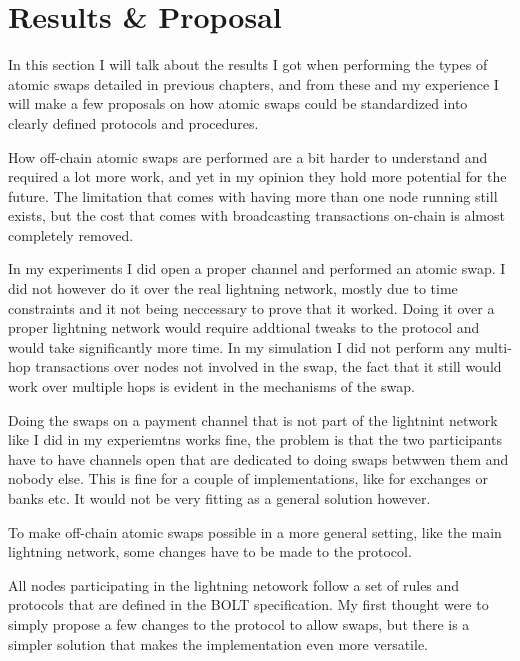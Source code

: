 \chapter{Results \& Proposal}
In this section I will talk about the results I got when performing the types 
of atomic swaps detailed in previous chapters, and from these and my experience 
I will make a few proposals on how atomic swaps could  be standardized into 
clearly defined protocols and procedures. 




How off-chain atomic swaps are performed are a bit harder to understand and 
required a lot more work, and yet in my opinion they hold more potential for 
the future. The limitation that comes with having more than one node running 
still exists, but the cost that comes with broadcasting transactions on-chain 
is almost completely removed. 

In my experiments I did open a proper channel and performed an atomic swap. 
I did not however do it over the real lightning  network, mostly due to time 
constraints and it not being neccessary to prove that it worked. Doing it over 
a proper lightning network would require addtional tweaks to the protocol and 
would take significantly more time. In my simulation I did not perform any 
multi-hop transactions over nodes not involved in the swap, the fact that it
still would work over multiple hops is evident in the mechanisms of the swap.

Doing the swaps on a payment channel that is not part of the lightnint network
like I did in my experiemtns works fine, the problem is that the two participants
have to have channels open that are dedicated to doing swaps betwwen them and nobody
else. This is fine for a couple of implementations, like for exchanges or banks 
etc. It would not be very fitting as a general solution however. 

To make off-chain atomic swaps possible in a more general setting, like the main
lightning network, some changes have to be made to the protocol. 

All nodes participating in the lightning netowork follow a set of rules and 
protocols that are defined in the BOLT specification. My first thought were to
simply propose a few changes to the protocol to allow swaps, but there is a 
simpler solution that makes the implementation even more versatile. 

